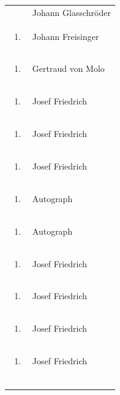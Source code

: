 \documentclass[a4paper]{article}
\begin{document}
\begin{flushleft}
\begin{supertabular}{m{1.2409999cm}m{14.604cm}}
\begin{enumerate}
\end{enumerate}
 &
Johann Glasschröder\\
\begin{enumerate}
\item
\end{enumerate}
 &
Johann Freisinger\\
\begin{enumerate}
\item
\end{enumerate}
 &
Gertraud von Molo\\
\begin{enumerate}
\item
\end{enumerate}
 &
Josef Friedrich\\
\begin{enumerate}
\item
\end{enumerate}
 &
Josef Friedrich\\
\begin{enumerate}
\item
\end{enumerate}
 &
Josef Friedrich\\
\begin{enumerate}
\item
\end{enumerate}
 &
Autograph\\
\begin{enumerate}
\item
\end{enumerate}
 &
Autograph\\
\begin{enumerate}
\item
\end{enumerate}
 &
Josef Friedrich\\
\begin{enumerate}
\item
\end{enumerate}
 &
Josef Friedrich\\
\begin{enumerate}
\item
\end{enumerate}
 &
Josef Friedrich\\
\begin{enumerate}
\item
\end{enumerate}
 &
Josef Friedrich\\
\begin{enumerate}

\end{enumerate}
\end{supertabular}
\end{flushleft}
\end{document}
